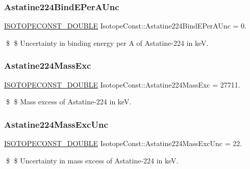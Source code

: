 \subsubsection{\texorpdfstring{Astatine224\+Bind\+E\+Per\+A\+Unc}{Astatine224BindEPerAUnc}}
{\footnotesize\ttfamily \mbox{\hyperlink{group___isotope_const-_macros_ga8f45a7272ce02c0b4c65c44636ed719a}{I\+S\+O\+T\+O\+P\+E\+C\+O\+N\+S\+T\+\_\+\+D\+O\+U\+B\+LE}} Isotope\+Const\+::\+Astatine224\+Bind\+E\+Per\+A\+Unc = 0.}

\$ \$ Uncertainty in binding energy per A of Astatine-\/224 in keV. \mbox{\label{group___isotope_const-_astatine-_at224_gad6c414c2dffd6de7d9db72f41e28897a}} 
\subsubsection{\texorpdfstring{Astatine224\+Mass\+Exc}{Astatine224MassExc}}
{\footnotesize\ttfamily \mbox{\hyperlink{group___isotope_const-_macros_ga8f45a7272ce02c0b4c65c44636ed719a}{I\+S\+O\+T\+O\+P\+E\+C\+O\+N\+S\+T\+\_\+\+D\+O\+U\+B\+LE}} Isotope\+Const\+::\+Astatine224\+Mass\+Exc = 27711.}

\$ \$ Mass excess of Astatine-\/224 in keV. \mbox{\label{group___isotope_const-_astatine-_at224_ga0f40a90be22d0a727a23fdc089c11162}} 
\subsubsection{\texorpdfstring{Astatine224\+Mass\+Exc\+Unc}{Astatine224MassExcUnc}}
{\footnotesize\ttfamily \mbox{\hyperlink{group___isotope_const-_macros_ga8f45a7272ce02c0b4c65c44636ed719a}{I\+S\+O\+T\+O\+P\+E\+C\+O\+N\+S\+T\+\_\+\+D\+O\+U\+B\+LE}} Isotope\+Const\+::\+Astatine224\+Mass\+Exc\+Unc = 22.}

\$ \$ Uncertainty in mass excess of Astatine-\/224 in keV. \mbox{\label{group___isotope_const-_astatine-_at224_gab86afc833d698c6f1851e625d5846c3a}} 
